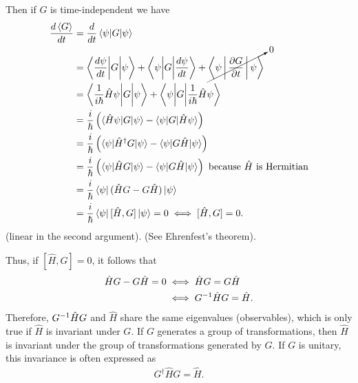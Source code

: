     Then if $G$ is time-independent we have
    \begin{align*}
        \frac{d\braket{G}}{dt} &= \frac{d}{dt}\braket{\psi|G|\psi} \\
        &= \Braket{\frac{d\psi}{dt}\biggl|G\biggr|\psi} + \Braket{\psi\biggl|G\biggr|\frac{d\psi}{dt}} + \cancelto{0}{\Braket{\psi|\frac{\partial G}{\partial t}|\psi}} \\
        &= \Braket{\frac{1}{i\hbar}\hat{H}\psi\biggl|G\biggr|\psi} + \Braket{\psi\biggl|G\biggr|\frac{1}{i\hbar}\hat{H}\psi} \\
        &= \frac{i}{\hbar}\left( \braket{\hat{H}\psi|G|\psi} - \braket{\psi|G|\hat{H}\psi} \right) \\
        &= \frac{i}{\hbar}\left( \braket{\psi|\hat{H}^\dagger G|\psi} - \braket{\psi|G\hat{H}|\psi} \right) \\
        &= \frac{i}{\hbar}\left( \braket{\psi|\hat{H}G|\psi} - \braket{\psi|G\hat{H}|\psi} \right) \textrm{ because }\hat{H}\textrm{ is Hermitian} \\
        &= \frac{i}{\hbar}\bra{\psi}(\hat{H}G - G\hat{H})\ket{\psi} \\
        &= \frac{i}{\hbar}\bra{\psi}[\hat{H},G]\ket{\psi} = 0 \iff [\hat{H},G] = 0.
    \end{align*}
    (linear in the second argument). (See Ehrenfest's theorem).

    Thus, if $[\hat{H},G]=0$, it follows that
    \begin{align*}
        \hat{H}G-G\hat{H} = 0
            &\iff \hat{H}G = G\hat{H} \\
            &\iff { G }^{-1}\hat{H}G = \hat{H}.
    \end{align*}
    Therefore, ${ G }^{-1}\hat{H}G$ and $\hat{H}$ share the same eigenvalues (observables), which is only true if $\hat{H}$ is invariant under $G$.
    If $G$ generates a group of transformations, then $\hat{H}$ is invariant under the group of transformations generated by $G$. If $G$ is unitary, this invariance is often expressed as 
    \begin{align*}
        G^\dagger\hat{H}G = \hat{H}.
    \end{align*}
    
